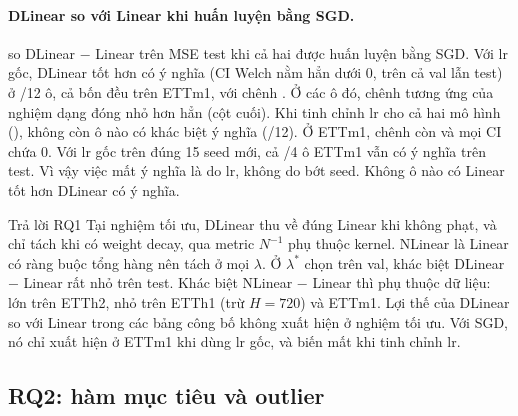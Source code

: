 \paragraph{DLinear so với Linear khi huấn luyện bằng SGD.}  so DLinear $-$ Linear trên MSE test khi cả hai được huấn luyện bằng SGD. Với lr gốc, DLinear tốt hơn có ý nghĩa (CI Welch nằm hẳn dưới $0$, trên cả val lẫn test) ở \nmCThreeDLinBetterBothCount/12 ô, cả bốn đều trên ETTm1, với chênh \nmCThreeSigDTestRange. Ở các ô đó, chênh tương ứng của nghiệm dạng đóng nhỏ hơn hẳn (cột cuối). Khi tinh chỉnh lr cho cả hai mô hình (), không còn ô nào có khác biệt ý nghĩa (\nmTunedCThreeDLinBetterCount/12). Ở ETTm1, chênh còn \nmTunedCThreeETTmOneDTestRange{} và mọi CI chứa $0$. Với lr gốc trên đúng 15 seed mới, cả \nmTunedCThreeXOneETTmOneTestCount/4 ô ETTm1 vẫn có ý nghĩa trên test. Vì vậy việc mất ý nghĩa là do lr, không do bớt seed. Không ô nào có Linear tốt hơn DLinear có ý nghĩa.

\begin{captionbelowboxaivn}
\label{tab:c3}
\end{captionbelowboxaivn}
\begin{center}
\footnotesize
\setlength{\tabcolsep}{4pt}

\end{center}

\begin{guidelinebox}{Trả lời RQ1}
Tại nghiệm tối ưu, DLinear thu về đúng Linear khi không phạt, và chỉ tách khi có weight decay, qua metric $N^{-1}$ phụ thuộc kernel. NLinear là Linear có ràng buộc tổng hàng nên tách ở mọi $\lambda$. Ở $\lambda^*$ chọn trên val, khác biệt DLinear $-$ Linear rất nhỏ trên test. Khác biệt NLinear $-$ Linear thì phụ thuộc dữ liệu: lớn trên ETTh2, nhỏ trên ETTh1 (trừ $H = 720$) và ETTm1. Lợi thế của DLinear so với Linear trong các bảng công bố không xuất hiện ở nghiệm tối ưu. Với SGD, nó chỉ xuất hiện ở ETTm1 khi dùng lr gốc, và biến mất khi tinh chỉnh lr.
\end{guidelinebox}

\subsection{RQ2: hàm mục tiêu và outlier}
\label{sec:rq2}

